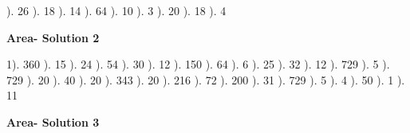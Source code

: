 \documentclass{article}%
\begin{document}
). 26%
). 18%
). 14%
). 64%
). 10%
). 3%
). 20%
). 18%
). 4%
\newline%
\newpage%
\large%
\begin{center}%
\textbf{Area- Solution 2}%
\newline%
\end{center} \normalsize%
1). 360%
). 15%
). 24%
). 54%
). 30%
). 12%
). 150%
). 64%
). 6%
). 25%
). 32%
). 12%
). 729%
). 5%
). 729%
). 20%
). 40%
). 20%
). 343%
). 20%
). 216%
). 72%
). 200%
). 31%
). 729%
). 5%
). 4%
). 50%
). 1%
). 11%
\newline%
\newpage%
\large%
\begin{center}%
\textbf{Area- Solution 3}%
\newline%
\end{center} \normalsize%
\end{document}
